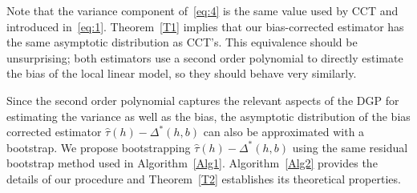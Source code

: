 \documentclass[12pt,fleqn]{article}
\begin{document}
Note that the variance component of~\eqref{eq:4} is the same value used by CCT
and introduced in~\eqref{eq:1}. Theorem~\ref{T1} implies that our bias-corrected
estimator has the same asymptotic distribution as CCT's. This equivalence should
be unsurprising; both estimators use a second order polynomial to directly estimate
the bias of the local linear model, so they should behave very similarly.

Since the second order polynomial captures the relevant aspects of the DGP for
estimating the variance as well as the bias, the asymptotic distribution of the
bias corrected estimator $\hat\tau(h) - \Delta^*(h,b)$ can also be approximated
with a bootstrap. We propose bootstrapping $\hat\tau(h) - \Delta^*(h,b)$ using
the same residual bootstrap method used in
Algorithm~\ref{Alg1}. Algorithm~\ref{Alg2} provides the details of our procedure
and Theorem~\ref{T2} establishes its theoretical properties.
\end{document}
